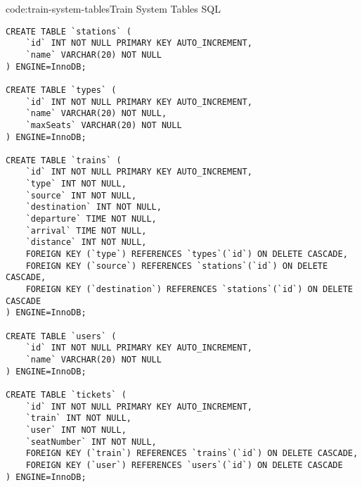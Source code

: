 \begin{codeenv}{code:train-system-tables}{Train System Tables SQL}
\begin{verbatim}
CREATE TABLE `stations` (
    `id` INT NOT NULL PRIMARY KEY AUTO_INCREMENT,
    `name` VARCHAR(20) NOT NULL
) ENGINE=InnoDB;

CREATE TABLE `types` (
    `id` INT NOT NULL PRIMARY KEY AUTO_INCREMENT,
    `name` VARCHAR(20) NOT NULL,
    `maxSeats` VARCHAR(20) NOT NULL
) ENGINE=InnoDB;

CREATE TABLE `trains` (
    `id` INT NOT NULL PRIMARY KEY AUTO_INCREMENT,
    `type` INT NOT NULL,
    `source` INT NOT NULL,
    `destination` INT NOT NULL,
    `departure` TIME NOT NULL,
    `arrival` TIME NOT NULL,
    `distance` INT NOT NULL,
    FOREIGN KEY (`type`) REFERENCES `types`(`id`) ON DELETE CASCADE,
    FOREIGN KEY (`source`) REFERENCES `stations`(`id`) ON DELETE CASCADE,
    FOREIGN KEY (`destination`) REFERENCES `stations`(`id`) ON DELETE CASCADE
) ENGINE=InnoDB;

CREATE TABLE `users` (
    `id` INT NOT NULL PRIMARY KEY AUTO_INCREMENT,
    `name` VARCHAR(20) NOT NULL
) ENGINE=InnoDB;

CREATE TABLE `tickets` (
    `id` INT NOT NULL PRIMARY KEY AUTO_INCREMENT,
    `train` INT NOT NULL,
    `user` INT NOT NULL,
    `seatNumber` INT NOT NULL,
    FOREIGN KEY (`train`) REFERENCES `trains`(`id`) ON DELETE CASCADE,
    FOREIGN KEY (`user`) REFERENCES `users`(`id`) ON DELETE CASCADE
) ENGINE=InnoDB;
\end{verbatim}
\end{codeenv}
\newpage

